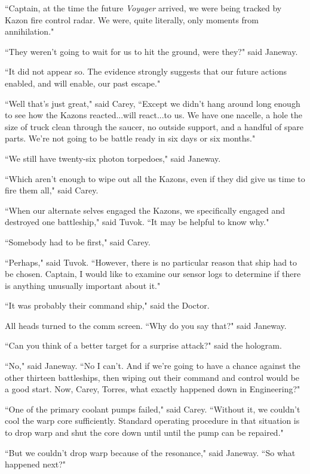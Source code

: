 \documentclass[twoside,letterpaper,12pt]{memoir}
\begin{document}
``Captain, at the time the future \textit{Voyager} arrived, we were being tracked by Kazon fire control radar. We were, quite literally, only moments from annihilation." 

``They weren't going to wait for us to hit the ground, were they?" said Janeway. 

``It did not appear so. The evidence strongly suggests that our future actions enabled, and will enable, our past escape." 

``Well that's just great," said Carey, ``Except we didn't hang around long enough to see how the Kazons reacted...will react...to us. We have one nacelle, a hole the size of truck clean through the saucer, no outside support, and a handful of spare parts. We're not going to be battle ready in six days or six months." 

``We still have twenty-six photon torpedoes," said Janeway. 

``Which aren't enough to wipe out all the Kazons, even if they did give us time to fire them all," said Carey. 

``When our alternate selves engaged the Kazons, we specifically engaged and destroyed one battleship," said Tuvok. ``It may be helpful to know why." 

``Somebody had to be first," said Carey. 

``Perhaps," said Tuvok. ``However, there is no particular reason that ship had to be chosen. Captain, I would like to examine our sensor logs to determine if there is anything unusually important about it." 

``It was probably their command ship," said the Doctor. 

All heads turned to the comm screen. ``Why do you say that?" said Janeway. 

``Can you think of a better target for a surprise attack?" said the hologram. 

``No," said Janeway. ``No I can't. And if we're going to have a chance against the other thirteen battleships, then wiping out their command and control would be a good start. Now, Carey, Torres, what exactly happened down in Engineering?" 

``One of the primary coolant pumps failed," said Carey. ``Without it, we couldn't cool the warp core sufficiently. Standard operating procedure in that situation is to drop warp and shut the core down until until the pump can be repaired." 

``But we couldn't drop warp because of the resonance," said Janeway. ``So what happened next?" 
\end{document}
